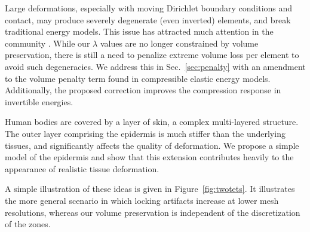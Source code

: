 Large deformations, especially with moving Dirichlet boundary
conditions and contact, may produce severely degenerate (even
inverted) elements, and break traditional energy models. This issue
has attracted much attention in the community \cite{Irving:2007,
	Stomakhin:2012,Smith:2018}.  While our $\lambda$ values are no
longer constrained by volume preservation, there is still a need to
penalize extreme volume loss per element to avoid such degeneracies.
We address this in Sec.~\ref{sec:penalty} with an amendment to the
volume penalty term found in compressible elastic energy
models. Additionally, the proposed correction improves the compression
response in invertible energies.

Human bodies are covered by a layer of skin, a complex multi-layered structure. The outer layer comprising the epidermis is much stiffer than the underlying tissues, and significantly affects the quality of deformation. We propose a simple model of the epidermis and show that this
extension contributes heavily to the appearance of realistic tissue deformation.


A simple illustration of these ideas is given in
Figure~\ref{fig:twotets}. It illustrates the more general scenario in
which locking artifacts increase at lower mesh resolutions, whereas our
volume preservation is independent of the discretization of the zones.




